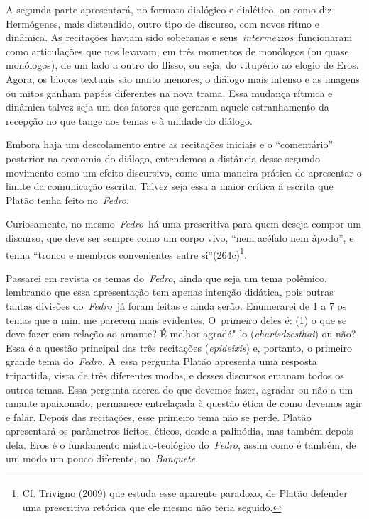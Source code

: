 A segunda parte apresentará, no formato dialógico e dialético, ou como
diz Hermógenes, mais distendido, outro tipo de discurso, com novos ritmo
e dinâmica. As recitações haviam sido soberanas e
seus~\emph{intermezzos}~funcionaram como articulações que nos levavam,
em três momentos de monólogos (ou quase monólogos), de um lado a outro
do Ilisso, ou seja, do vitupério ao elogio de Eros. Agora, os blocos
textuais são muito menores, o diálogo mais intenso e as imagens ou mitos
ganham papéis diferentes na nova trama. Essa mudança rítmica e dinâmica
talvez seja um dos fatores que geraram aquele estranhamento da recepção
no que tange aos temas e à unidade do diálogo.

Embora haja um descolamento entre as recitações iniciais e o ``comentário''
posterior na economia do diálogo, entendemos a distância desse segundo
movimento como um efeito discursivo, como uma maneira prática de
apresentar o limite da comunicação escrita. Talvez seja essa a maior
crítica à escrita que Platão tenha feito no~\emph{Fedro}.

Curiosamente, no mesmo~\emph{Fedro}~há uma prescritiva para quem deseja
compor um discurso, que deve ser sempre como um corpo vivo, ``nem
acéfalo nem ápodo'', e tenha ``tronco e membros convenientes entre
si''(264c)\footnote{Cf. Trivigno (2009) que estuda esse aparente
  paradoxo, de Platão defender uma prescritiva retórica que ele mesmo
  não teria seguido.}.

Passarei em revista os temas do~\emph{Fedro}, ainda que seja um tema
polêmico, lembrando que essa apresentação tem apenas intenção didática,
pois outras tantas divisões do~\emph{Fedro}~já foram feitas e ainda
serão. Enumerarei de 1 a 7 os temas que a mim me parecem mais evidentes.
O~primeiro deles é: (1) o que se deve fazer com relação ao amante? É
melhor agradá"-lo (\emph{charísdzesthai}) ou não? Essa é a questão
principal das três recitações (\emph{epideixis}) e, portanto, o primeiro
grande tema do~\emph{Fedro}. A~essa pergunta Platão apresenta uma
resposta tripartida, vista de três diferentes modos, e desses discursos
emanam todos os outros temas. Essa pergunta acerca do que devemos fazer,
agradar ou não a um amante apaixonado, permanece entrelaçada à questão
ética de como devemos agir e falar. Depois das recitações, esse primeiro
tema não se perde. Platão apresentará os parâmetros lícitos, éticos,
desde a palinódia, mas também depois dela. Eros é o fundamento místico-teológico
 do~\emph{Fedro}, assim como é também, de um modo um pouco
diferente, no~\emph{Banquete}.

